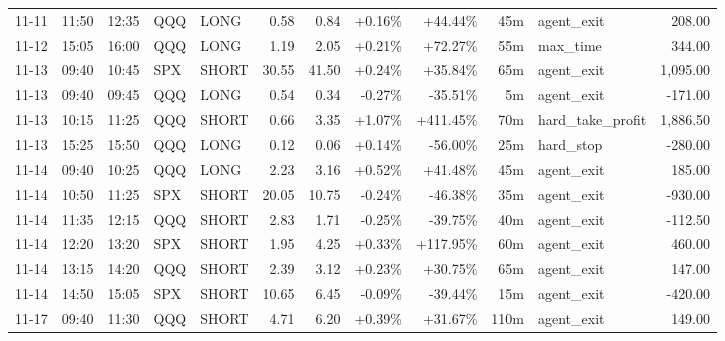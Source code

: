 \documentclass[11pt,a4paper,twoside]{article}
\begin{document}
\begin{center}
\begin{longtable}{>{\color{txtmain}}l l l l l r r r r r >{\color{txtmain}}l r}
11-11 & 11:50 & 12:35 & QQQ & LONG & 0.58 & 0.84 & \textcolor{wingreen}{+0.16\%} & \textcolor{wingreen}{+44.44\%} & 45m & agent\_exit & \textcolor{wingreen}{208.00} \\
11-12 & 15:05 & 16:00 & QQQ & LONG & 1.19 & 2.05 & \textcolor{wingreen}{+0.21\%} & \textcolor{wingreen}{+72.27\%} & 55m & max\_time & \textcolor{wingreen}{344.00} \\
11-13 & 09:40 & 10:45 & SPX & SHORT & 30.55 & 41.50 & \textcolor{wingreen}{+0.24\%} & \textcolor{wingreen}{+35.84\%} & 65m & agent\_exit & \textcolor{wingreen}{1,095.00} \\
11-13 & 09:40 & 09:45 & QQQ & LONG & 0.54 & 0.34 & \textcolor{lossred}{-0.27\%} & \textcolor{lossred}{-35.51\%} & 5m & agent\_exit & \textcolor{lossred}{-171.00} \\
11-13 & 10:15 & 11:25 & QQQ & SHORT & 0.66 & 3.35 & \textcolor{wingreen}{+1.07\%} & \textcolor{wingreen}{+411.45\%} & 70m & hard\_take\_profit & \textcolor{wingreen}{1,886.50} \\
11-13 & 15:25 & 15:50 & QQQ & LONG & 0.12 & 0.06 & \textcolor{wingreen}{+0.14\%} & \textcolor{lossred}{-56.00\%} & 25m & hard\_stop & \textcolor{lossred}{-280.00} \\
11-14 & 09:40 & 10:25 & QQQ & LONG & 2.23 & 3.16 & \textcolor{wingreen}{+0.52\%} & \textcolor{wingreen}{+41.48\%} & 45m & agent\_exit & \textcolor{wingreen}{185.00} \\
11-14 & 10:50 & 11:25 & SPX & SHORT & 20.05 & 10.75 & \textcolor{lossred}{-0.24\%} & \textcolor{lossred}{-46.38\%} & 35m & agent\_exit & \textcolor{lossred}{-930.00} \\
11-14 & 11:35 & 12:15 & QQQ & SHORT & 2.83 & 1.71 & \textcolor{lossred}{-0.25\%} & \textcolor{lossred}{-39.75\%} & 40m & agent\_exit & \textcolor{lossred}{-112.50} \\
11-14 & 12:20 & 13:20 & SPX & SHORT & 1.95 & 4.25 & \textcolor{wingreen}{+0.33\%} & \textcolor{wingreen}{+117.95\%} & 60m & agent\_exit & \textcolor{wingreen}{460.00} \\
11-14 & 13:15 & 14:20 & QQQ & SHORT & 2.39 & 3.12 & \textcolor{wingreen}{+0.23\%} & \textcolor{wingreen}{+30.75\%} & 65m & agent\_exit & \textcolor{wingreen}{147.00} \\
11-14 & 14:50 & 15:05 & SPX & SHORT & 10.65 & 6.45 & \textcolor{lossred}{-0.09\%} & \textcolor{lossred}{-39.44\%} & 15m & agent\_exit & \textcolor{lossred}{-420.00} \\
11-17 & 09:40 & 11:30 & QQQ & SHORT & 4.71 & 6.20 & \textcolor{wingreen}{+0.39\%} & \textcolor{wingreen}{+31.67\%} & 110m & agent\_exit & \textcolor{wingreen}{149.00} \\

\end{longtable}
\end{center}
\end{document}
